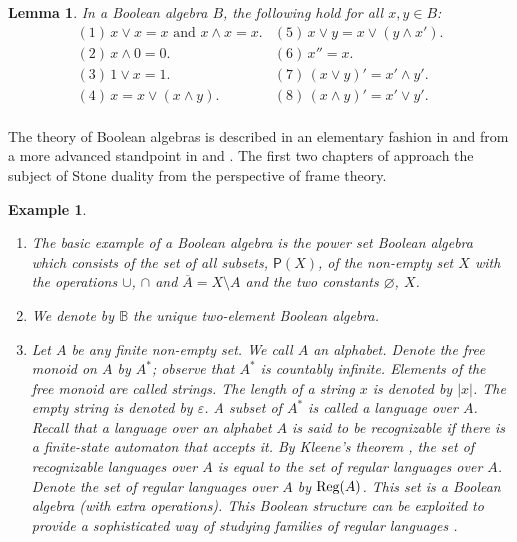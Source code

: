 \documentclass[a4paper]{amsart}
\newtheorem{lemma}[theorem]{Lemma}
\newtheorem{example}[theorem]{Example}
\begin{document}
\begin{lemma}\label{lem:basic-properties} In a Boolean algebra $B$, the following hold for all $x,y \in B$:
$$\begin{array}{ll}
(1)\, x \vee x = x \text{ and } x \wedge x = x. &(5)\, x \vee y = x \vee (y \wedge x').\\
(2)\, x \wedge 0 = 0.                           &(6)\, x'' = x.\\
(3)\, 1 \vee x = 1.                             &(7)\, (x \vee y)' = x' \wedge y'.\\
(4)\, x = x \vee (x \wedge y).                  &(8)\, (x \wedge y)' = x' \vee y'. \\
\end{array}
$$
\end{lemma}


The theory of Boolean algebras is described in an elementary fashion in \cite{GH}
and from a more advanced standpoint in \cite{Koppelberg} and \cite{Sikorski}.
The first two chapters of \cite{Johnstone} approach the subject of Stone duality from the perspective of frame theory.

\begin{example} \mbox{}
{\em
\begin{enumerate}

\item The basic example of a Boolean algebra is the 
{\em power set Boolean algebra} which consists of the set of all subsets, $\mathsf{P}(X)$, of the non-empty set $X$
with the operations $\cup$, $\cap$ and $\overline{A} = X \setminus A$ and the two constants $\varnothing$, $X$.

\item We denote by $\mathbb{B}$ the unique two-element Boolean algebra.

\item Let $A$ be any finite non-empty set.
We call $A$ an {\em alphabet}.
Denote the free monoid on $A$ by $A^{\ast}$;
observe that $A^{\ast}$ is countably infinite.
Elements of the free monoid are called {\em strings}.
The {\em length} of a string $x$ is denoted by $|x|$.
The empty string is denoted by $\varepsilon$.
A subset of $A^{\ast}$ is called a {\em language} over $A$.
Recall that a language over an alphabet $A$ is said to be {\em recognizable} if there is a finite-state
automaton that accepts it. By Kleene's theorem \cite{Lawson2003}, the set of recognizable languages over $A$ is equal to the set of regular languages over $A$.
Denote the set of regular languages over $A$ by $\mbox{\rm Reg}(A)$.
This set is a Boolean algebra (with extra operations).
This Boolean structure can be exploited to provide a sophisticated way of studying families of regular languages \cite{Pipp, G}.

\end{enumerate}
}
\end{example}
\end{document}
